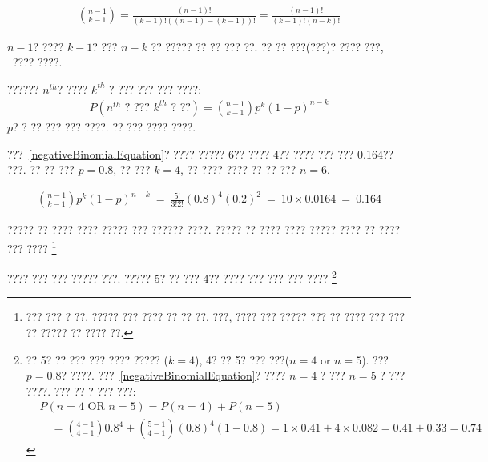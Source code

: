 \begin{eqnarray*}
{n-1 \choose k-1} = \frac{(n-1)!}{(k-1)! \left((n-1) - (k-1)\right)!} = \frac{(n-1)!}{(k-1)! \left(n - k\right)!}
\end{eqnarray*}

$n-1$? ???? $k-1$? ??? $n-k$  ?? ????? ?? ?? ??? ??. ?? ?? ???(???)? ???? ???, \pageref{factorialDefinitionInTheBinomialSection}~???? ????.

\begin{termBox}{
?????? $n^{th}$? ???? $k^{th}$ ? ??? ??? ??? ????:
\begin{eqnarray}
P(\text{$n^{th}$ ? ??? $k^{th}$ ? ??}) = {n-1 \choose k-1} p^{k}(1-p)^{n-k}
\label{negativeBinomialEquation}
\end{eqnarray}
$p$? ? ?? ??? ??? ????. ?? ??? ???? ????.}
\end{termBox}

\textC{\pagebreak}

\begin{example}{
???~\eqref{negativeBinomialEquation}? ???? ????? 6?? ???? 4?? ???? ??? ??? 0.164?? ???.}
?? ?? ??? $p=0.8$, ?? ??? $k=4$, ?? ???? ???? ?? ?? ??? $n=6$.

\begin{align*}
{n-1 \choose k-1}p^k(1-p)^{n-k}\ 
	=\ \frac{5!}{3!2!} (0.8)^4 (0.2)^2\ 
	=\ 10\times 0.0164\ 
	=\ 0.164
\end{align*}
\end{example}

\begin{exercise}
????? ?? ???? ???? ????? ??? ?????? ????. ????? ?? ???? ???? ????? ???? ?? ???? ??? ????
\footnote{??? ??? ? ??. ????? ??? ???? ?? ?? ??. ???, ???? ??? ????? ??? ?? ???? ??? ??? ?? ????? ?? ???? ??.}
\end{exercise}

\begin{exercise}
???? ??? ??? ????? ???. ????? 5? ?? ??? 4?? ???? ??? ??? ??? ????
\footnote{
?? 5? ?? ??? ??? ???? ????? ($k=4$), 4? ?? 5? ??? ???($n=4$ or $n=5$). ??? $p=0.8$? ????. ???~\eqref{negativeBinomialEquation}? ???? $n=4$ ? ??? $n=5$ ? ??? ????. ??? ?? ? ??? ???:
\begin{align*}
& P(n=4\text{ OR }n=5) = P(n=4) + P(n=5) \\
&\quad = {4-1 \choose 4-1} 0.8^4 + {5-1 \choose 4-1} (0.8)^4(1-0.8) = 1\times 0.41 + 4\times 0.082 = 0.41 + 0.33 = 0.74
\end{align*}}
\end{exercise}

